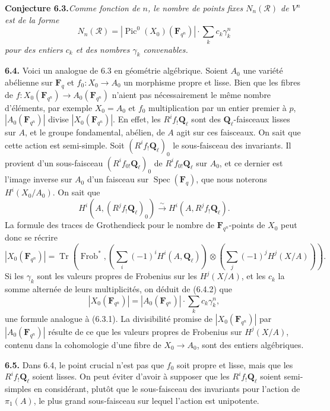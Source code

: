 \documentclass[11pt]{article}
\newcommand{\Fq}{\mathbf{F}_q}
\newcommand{\F}{\mathbf{F}}
\newcommand{\Ql}{\mathbf{Q}_{\ell}}
\newcommand{\Spec}{\operatorname{Spec}}
\newcommand{\Frob}{\operatorname{Frob}}
\newcommand{\Pic}{\operatorname{Pic}}
\newcommand{\Tr}{\operatorname{Tr}}
\newcommand{\para}[1]{\medskip\noindent\textbf{#1}\enspace}
\begin{document}
\noindent\textbf{Conjecture 6.3.}\quad\textit{Comme fonction de \(n\), le nombre de points fixes \(N_n(\mathcal R)\) de \(V^n\) est de la forme}
\begin{equation}
  N_n(\mathcal R)=|\Pic^0(X_0)(\F_{q^n})|\cdot \sum_k c_k\gamma_k^n
\tag{6.3.1}
\end{equation}
\textit{pour des entiers \(c_k\) et des nombres \(\gamma_k\) convenables.}

\para{6.4.} Voici un analogue de 6.3 en géométrie algébrique. Soient \(A_0\) une variété abélienne sur \(\Fq\) et \(f_0:X_0\to A_0\) un morphisme propre et lisse. Bien que les fibres de \(f:X_0(\F_{q^n})\to A_0(\F_{q^n})\) n'aient pas nécessairement le même nombre d'éléments, par exemple \(X_0=A_0\) et \(f_0\) multiplication par un entier premier à \(p\), \(|A_0(\F_{q^n})|\) divise \(|X_0(\F_{q^n})|\). En effet, les \(R^if_!\Ql\) sont des \(\Ql\)-faisceaux lisses sur \(A\), et le groupe fondamental, abélien, de \(A\) agit sur ces faisceaux. On sait que cette action est semi-simple. Soit \((R^if_!\Ql)_0\) le sous-faisceau des invariants. Il provient d'un sous-faisceau \((R^if_{0!}\Ql)_0\) de \(R^if_{0!}\Ql\) sur \(A_0\), et ce dernier est l'image inverse sur \(A_0\) d'un faisceau sur \(\Spec(\Fq)\), que nous noterons \(H^i(X_0/A_0)\). On sait que
\begin{equation}
  H^i(A,(R^jf_!\Ql)_0)\xrightarrow{\sim}H^i(A,R^jf_!\Ql).
\tag{6.4.1}
\end{equation}
La formule des traces de Grothendieck pour le nombre de \(\F_{q^n}\)-points de \(X_0\) peut donc se récrire
\begin{equation}
  |X_0(\F_{q^n})|
  =\Tr\left(\Frob^*,\left(\sum_i(-1)^iH^i(A,\Ql)\right)\otimes
  \left(\sum_j(-1)^jH^j(X/A)\right)\right).
\tag{6.4.2}
\end{equation}
Si les \(\gamma_k\) sont les valeurs propres de Frobenius sur les \(H^j(X/A)\), et les \(c_k\) la somme alternée de leurs multiplicités, on déduit de (6.4.2) que
\begin{equation}
  |X_0(\F_{q^n})|=|A_0(\F_{q^n})|\cdot \sum_k c_k\gamma_k^n,
\tag{6.4.3}
\end{equation}
une formule analogue à (6.3.1). La divisibilité promise de \(|X_0(\F_{q^n})|\) par \(|A_0(\F_{q^n})|\) résulte de ce que les valeurs propres de Frobenius sur \(H^j(X/A)\), contenu dans la cohomologie d'une fibre de \(X_0\to A_0\), sont des entiers algébriques.

\para{6.5.} Dans 6.4, le point crucial n'est pas que \(f_0\) soit propre et lisse, mais que les \(R^if_!\Ql\) soient lisses. On peut éviter d'avoir à supposer que les \(R^if_!\Ql\) soient semi-simples en considérant, plutôt que le sous-faisceau des invariants pour l'action de \(\pi_1(A)\), le plus grand sous-faisceau sur lequel l'action est unipotente.
\end{document}
